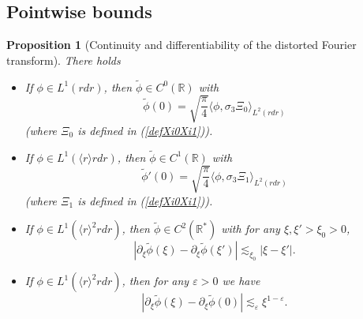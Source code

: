 \documentclass[11 pt]{amsart}
\newtheorem{prop}{Proposition}[section]
\theoremstyle{definition}
\theoremstyle{remark}
\numberwithin{equation}{section}
\begin{document}
\subsection{Pointwise bounds}

\begin{prop}[Continuity and differentiability of the distorted Fourier transform]
  \label{pointwiseestimates}There holds
\begin{itemize}
\item[(i)] If $\phi \in L^1 (r d r)$, then $\widetilde{\phi} \in C^0 (\mathbb{R})$ with
  \[ \widetilde{\phi} (0) = \sqrt{\frac{\pi}{4}} \langle \phi, \sigma_3 \Xi_0
     \rangle_{L^2 (r d r)} \]
  (where $\Xi_0$ is defined in (\ref{defXi0Xi1})).
  
\item[(ii)] If $\phi \in L^1 (\langle r \rangle r d r)$, then $\widetilde{\phi} \in
  C^1 (\mathbb{R})$ with
  \[ \widetilde{\phi}' (0) = \sqrt{\frac{\pi}{4}} \langle \phi, \sigma_3 \Xi_1
     \rangle_{L^2 (r d r)} \]
  (where $\Xi_1$ is defined in (\ref{defXi0Xi1})).
  
\item[(iii)] If $\phi \in L^1 (\langle r \rangle^2 r d r)$, then $\widetilde{\phi} \in
  C^2 (\mathbb{R}^{\ast})$ with for any $\xi, \xi' > \xi_0 > 0$,
  \[ | \partial_{\xi} \widetilde{\phi} (\xi) - \partial_{\xi} \widetilde{\phi} (\xi')
     | \lesssim_{\xi_0} | \xi - \xi' | . \]
  
\item[(iv)] If $\phi \in L^1 (\langle r \rangle^2 r d r)$, then for any
  $\varepsilon > 0$ we have
  \[ | \partial_{\xi} \widetilde{\phi} (\xi) - \partial_{\xi} \widetilde{\phi} (0) |
     \lesssim_{\varepsilon} \xi^{1 - \varepsilon} . \]
\end{itemize}
\end{prop}
\end{document}
